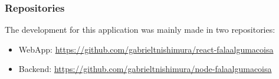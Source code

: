\subsubsection{Repositories}

The development for this application was mainly made in two repositories:

\begin{itemize}
    \item WebApp: \url{https://github.com/gabrieltnishimura/react-falaalgumacoisa}
    \item Backend: \url{https://github.com/gabrieltnishimura/node-falaalgumacoisa}
\end{itemize}
